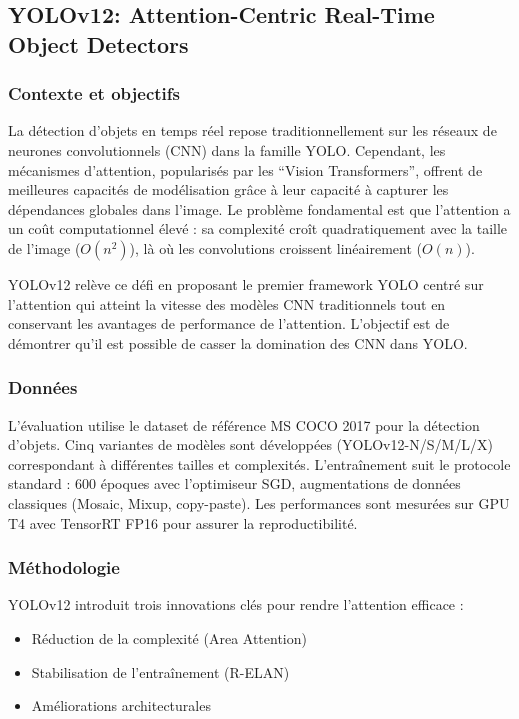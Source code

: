 \subsection{YOLOv12: Attention-Centric Real-Time Object Detectors}
\label{subsec:yolov12_attention_centric}

\subsubsection{Contexte et objectifs}
La détection d'objets en temps réel repose traditionnellement sur les réseaux de neurones convolutionnels (CNN) dans la famille YOLO. Cependant, les mécanismes d'attention, popularisés par les ``Vision Transformers'', offrent de meilleures capacités de modélisation grâce à leur capacité à capturer les dépendances globales dans l'image. Le problème fondamental est que l'attention a un coût computationnel élevé : sa complexité croît quadratiquement avec la taille de l'image ($O(n^2)$), là où les convolutions croissent linéairement ($O(n)$). 

YOLOv12 relève ce défi en proposant le premier framework YOLO centré sur l'attention qui atteint la vitesse des modèles CNN traditionnels tout en conservant les avantages de performance de l'attention. L'objectif est de démontrer qu'il est possible de casser la domination des CNN dans YOLO.

\subsubsection{Données}
L'évaluation utilise le dataset de référence MS COCO 2017 \cite{coco_coco_nodate} pour la détection d'objets. Cinq variantes de modèles sont développées (YOLOv12-N/S/M/L/X) correspondant à différentes tailles et complexités. L'entraînement suit le protocole standard : 600 époques avec l'optimiseur SGD, augmentations de données classiques (Mosaic, Mixup, copy-paste). Les performances sont mesurées sur GPU T4 avec TensorRT FP16 pour assurer la reproductibilité.

\subsubsection{Méthodologie}
YOLOv12 introduit trois innovations clés pour rendre l'attention efficace :
\begin{itemize}
    \item Réduction de la complexité (Area Attention)
    \item Stabilisation de l'entraînement (R-ELAN)
    \item Améliorations architecturales
\end{itemize}

